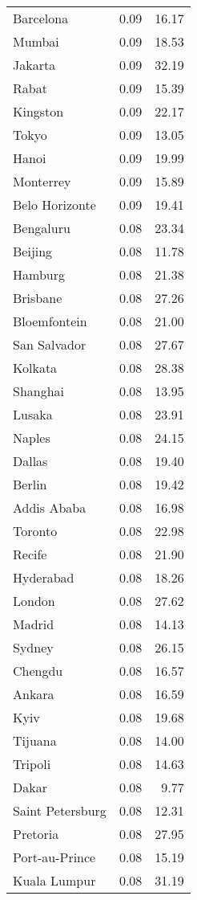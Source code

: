 \begin{longtable}{lrr}
  Barcelona & 0.09 & 16.17 \\ 
  Mumbai & 0.09 & 18.53 \\ 
  Jakarta & 0.09 & 32.19 \\ 
  Rabat & 0.09 & 15.39 \\ 
  Kingston & 0.09 & 22.17 \\ 
  Tokyo & 0.09 & 13.05 \\ 
  Hanoi & 0.09 & 19.99 \\ 
  Monterrey & 0.09 & 15.89 \\ 
  Belo Horizonte & 0.09 & 19.41 \\ 
  Bengaluru & 0.08 & 23.34 \\ 
  Beijing & 0.08 & 11.78 \\ 
  Hamburg & 0.08 & 21.38 \\ 
  Brisbane & 0.08 & 27.26 \\ 
  Bloemfontein & 0.08 & 21.00 \\ 
  San Salvador & 0.08 & 27.67 \\ 
  Kolkata & 0.08 & 28.38 \\ 
  Shanghai & 0.08 & 13.95 \\ 
  Lusaka & 0.08 & 23.91 \\ 
  Naples & 0.08 & 24.15 \\ 
  Dallas & 0.08 & 19.40 \\ 
  Berlin & 0.08 & 19.42 \\ 
  Addis Ababa & 0.08 & 16.98 \\ 
  Toronto & 0.08 & 22.98 \\ 
  Recife & 0.08 & 21.90 \\ 
  Hyderabad & 0.08 & 18.26 \\ 
  London & 0.08 & 27.62 \\ 
  Madrid & 0.08 & 14.13 \\ 
  Sydney & 0.08 & 26.15 \\ 
  Chengdu & 0.08 & 16.57 \\ 
  Ankara & 0.08 & 16.59 \\ 
  Kyiv & 0.08 & 19.68 \\ 
  Tijuana & 0.08 & 14.00 \\ 
  Tripoli & 0.08 & 14.63 \\ 
  Dakar & 0.08 & 9.77 \\ 
  Saint Petersburg & 0.08 & 12.31 \\ 
  Pretoria & 0.08 & 27.95 \\ 
  Port-au-Prince & 0.08 & 15.19 \\ 
  Kuala Lumpur & 0.08 & 31.19 \\ 

\end{longtable}
